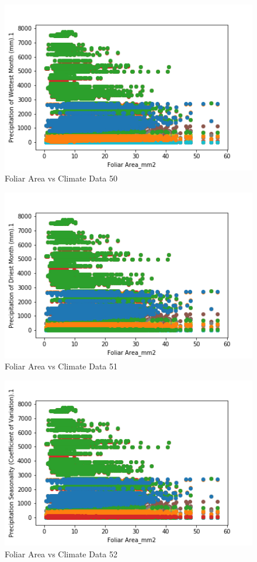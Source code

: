 \documentclass[letterpaper]{article}
\begin{document}
\begin{figure}[h]
\caption{Foliar Area vs Climate Data 50\label{fig:Foliar_Area_vs_50}}
\centering
\includegraphics[width=0.7\paperwidth]{Foliar_Area_vs_50}
\end{figure}


\begin{figure}[h]
\caption{Foliar Area vs Climate Data 51\label{fig:Foliar_Area_vs_51}}
\centering
\includegraphics[width=0.7\paperwidth]{Foliar_Area_vs_51}
\end{figure}


\begin{figure}[h]
\caption{Foliar Area vs Climate Data 52\label{fig:Foliar_Area_vs_52}}
\centering
\includegraphics[width=0.7\paperwidth]{Foliar_Area_vs_52}
\end{figure}
\end{document}

